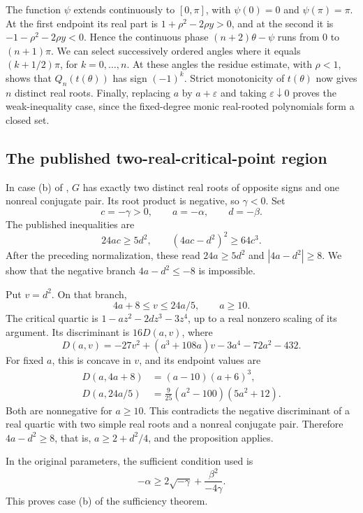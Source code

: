 \begin{proof*}
The function $\psi$ extends continuously to $[0,\pi]$, with
$\psi(0)=0$ and $\psi(\pi)=\pi$. At the first endpoint its real
part is $1+\rho^2-2\rho y>0$, and at the second it is
$-1-\rho^2-2\rho y<0$. Hence the continuous phase
$(n+2)\theta-\psi$ runs from $0$ to $(n+1)\pi$.
We can select successively ordered angles where it equals
$(k+1/2)\pi$, for $k=0,\dotsc,n$. At these angles the residue estimate, with
$\rho<1$, shows that $Q_n(t(\theta))$ has sign $(-1)^k$.
Strict monotonicity of $t(\theta)$ now gives $n$ distinct real roots.
Finally, replacing $a$ by $a+\varepsilon$ and taking
$\varepsilon\downarrow0$ proves the weak-inequality case, since
the fixed-degree monic real-rooted polynomials form a closed set.
\end{proof*}

\subsection[toeplitzPublishedHessenbergRegion]{The published two-real-critical-point region}

In case (b) of \cite[Thm.~5]{Ndikubwayo2022Toeplitz}, $G$ has exactly two distinct real roots of opposite
signs and one nonreal conjugate pair. Its root product is negative, so
$\gamma<0$. Set
\[
 c=-\gamma>0,\qquad a=-\alpha,\qquad d=-\beta.
\]
The published inequalities are
\[
 24ac\geq5d^2,\qquad (4ac-d^2)^2\geq64c^3.
\]
After the preceding normalization, these read
$24a\geq5d^2$ and $|4a-d^2|\geq8$.
We show that the negative branch $4a-d^2\leq-8$ is impossible.

Put $v=d^2$. On that branch,
\[
 4a+8\leq v\leq24a/5,\qquad a\geq10.
\]
The critical quartic is $1-az^2-2dz^3-3z^4$, up to a real
nonzero scaling of its argument. Its discriminant is $16D(a,v)$, where
\[
 D(a,v)=-27v^2+(a^3+108a)v-3a^4-72a^2-432.
\]
For fixed $a$, this is concave in $v$, and its endpoint values are
\begin{align*}
 D(a,4a+8)&=(a-10)(a+6)^3,\\
 D(a,24a/5)&=\frac9{25}(a^2-100)(5a^2+12).
\end{align*}
Both are nonnegative for $a\geq10$. This contradicts the negative
discriminant of a real quartic with two simple real roots and a nonreal
conjugate pair. Therefore $4a-d^2\geq8$, that is,
$a\geq2+d^2/4$, and the proposition applies.

In the original parameters, the sufficient condition used is
\[
 -\alpha\geq2\sqrt{-\gamma}+\frac{\beta^2}{-4\gamma}.
\]
This proves case (b) of the sufficiency theorem.
